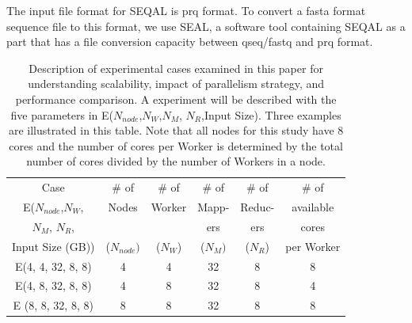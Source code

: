 \documentclass{acm_proc_article-sp}
\begin{document}
The input file format for SEQAL is prq format.  To convert a fasta format sequence file to this format, we use SEAL, a software tool containing SEQAL as a part that has a file conversion capacity between qseq/fastq and prq format.  

\begin{table}
\small
 \begin{tabular}{|c|c|c|c|c|c|} 
 \hline 

Case & \# of  & \# of &  \# of & \# of & \# of  \\
E($N_{node}$,$N_W$,  & Nodes & Worker   & Mapp- & Reduc- & available  \\
$N_M$, $N_R$,  & &  & ers & ers & cores \\
Input Size (GB)) & ($N_{node})$& ($N_W$) & ($N_M) $ & ($N_R$) & per Worker \\
 \hline
E(4, 4, 32, 8, 8) &4 &  4 & 32  & 8 & 8 \\
E(4, 8, 32, 8, 8) & 4 & 8 & 32 & 8 & 4 \\
E (8, 8, 32, 8, 8) & 8 & 8 & 32 & 8 & 8 \\ 
 \hline
 \end{tabular}

 \caption{Description of experimental cases examined in this paper for understanding scalability, impact of parallelism strategy, and performance comparison.  A experiment will be described with the five parameters in E($N_{node}$,$N_W$,$N_M$, $N_R$,Input Size).  Three examples are illustrated in this table.  Note that all nodes for this study have 8 cores and the number of cores per Worker is determined by the total number of cores divided by the number of Workers in a node.}
    \label{table:exp-description} 
\end{table}
\end{document}
